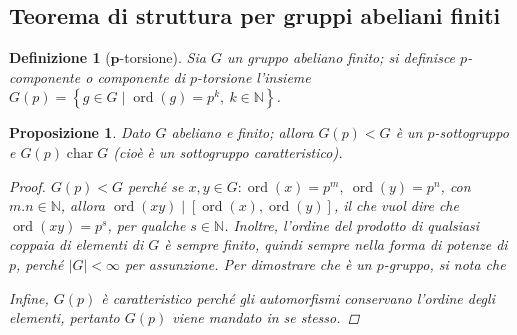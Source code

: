 \documentclass[11pt]{scrartcl}
\theoremstyle{style1}
\newtheorem{prop}{Proposizione}[section]
\newtheorem{definizione}{Definizione}[section]
\numberwithin{equation}{subsection}
\begin{document}
\subsection{Teorema di struttura per gruppi abeliani finiti}
\begin{definizione}
	[$\mathbf{p}$-torsione]
Sia $G$ un gruppo abeliano finito; si definisce \textit{$p$-componente} o \textit{componente di $p$-torsione} l'insieme $G(p) = \left\{ g \in  G  \mid \operatorname{ord}(g) =p^k, \ k \in \mathbb{N} \right\} $.
\end{definizione}
\begin{prop}
	Dato $G$ abeliano e finito; allora $G(p) < G$ \`e un $p$-sottogruppo e $G(p) \operatorname{char} G$ (cio\`e \`e un sottogruppo caratteristico).
	\begin{proof}
		$G(p) < G$ perch\'e se $x,y \in G : \operatorname{ord}(x) =p^m,\  \operatorname{ord}(y) =p^n$, con $m.n \in \mathbb{N}$, allora $\operatorname{ord}(xy)  \mid [\operatorname{ord}(x) , \operatorname{ord}(y) ]$, il che vuol dire che $\operatorname{ord}(xy) = p^s$, per qualche $s \in  \mathbb{N}$.
		Inoltre, l'ordine del prodotto di qualsiasi coppaia di elementi di $G$ \`e sempre finito, quindi sempre nella forma di potenze di $p$, perch\'e $\lvert G \rvert < \infty$ per assunzione.
		Per dimostrare che \`e un $p$-gruppo, si nota che 

		Infine, $G(p)$ \`e caratteristico perch\'e gli automorfismi conservano l'ordine degli elementi, pertanto $G(p)$ viene mandato in se stesso.
	\end{proof}
\end{prop}
\end{document}
